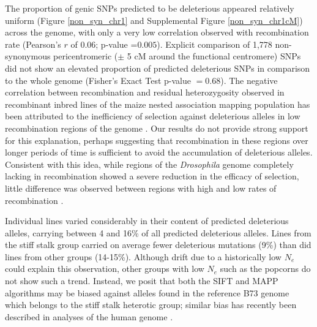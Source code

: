 \documentclass[12pt]{article}
\begin{document}
The proportion of genic SNPs predicted to be deleterious appeared relatively uniform (Figure \ref{non_syn_chr1} and  Supplemental Figure \ref{non_syn_chr1cM}) across the genome, with only a very low correlation  observed with recombination rate (Pearson's $r$ of 0.06; p-value =$0.005$).  Explicit comparison of 1,778 non-synonymous pericentromeric ($\pm$ 5 cM around the functional centromere) SNPs did not show an elevated proportion of predicted deleterious SNPs  in comparison to the whole genome (Fisher's Exact Test p-value $= 0.68$). 
The negative correlation between recombination and residual heterozygosity observed in recombinant inbred lines of the maize nested association mapping population has been attributed to the inefficiency of selection against deleterious alleles in low recombination regions of the genome \citep{McMullen2009,Gore2009}. 
Our results do not provide strong support for this explanation, perhaps suggesting that recombination in these regions over longer periods of time is sufficient to avoid the accumulation of deleterious alleles. Consistent with this idea, while regions of the \emph{Drosophila} genome completely lacking in recombination showed a severe reduction in the efficacy of selection, little difference was observed between regions with high and low rates of recombination \citep{Haddrill2007}.

Individual lines varied considerably in their content of predicted deleterious alleles, carrying between 4 and 16\% of all predicted deleterious alleles. Lines from the stiff stalk group carried on average fewer deleterious mutations (9\%) than did lines from other groups (14-15\%).  Although drift due to a  historically low $N_{e}$ \citep{Messmer1991} could explain this observation, other groups with low $N_{e}$ such as the popcorns do not show such a trend.  Instead, we posit that both the SIFT and MAPP algorithms may be biased against alleles found in the reference B73 genome which belongs to the stiff stalk heterotic group; similar bias has recently been described in analyses of the human genome \citep{Simons2013}.
\end{document}
